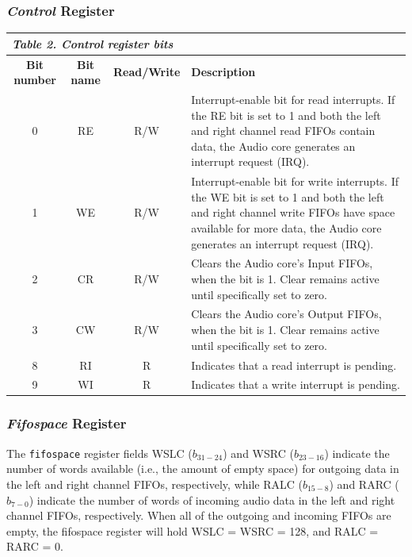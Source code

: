 \documentclass[11pt, twoside, pdftex]{article}
\begin{document}
\newpage
\subsubsection{\textit{Control} Register}
\begin{table}[h]
    \centering
    \begin{tabular}{|c|c|c|p{8.0cm}|}
        \hline
        \multicolumn{4}{|l|}{\it \textbf{Table 2. Control register bits}}
        \\\hline
            \textbf{Bit number}
            & \textbf{Bit name}
            & \textbf{Read/Write}
            & \textbf{Description}
        \\\hline
            0
            & RE
            & R/W
			& Interrupt-enable bit for read interrupts. If the RE bit is set to
			1 and both the left and right channel read FIFOs contain data, the
			Audio core generates an interrupt request (IRQ).
        \\\hline
            1
            & WE
            & R/W
			& Interrupt-enable bit for write interrupts. If the WE bit is set
			to 1 and both the left and right channel write FIFOs have space
			available for more data, the Audio core generates an interrupt 
			request (IRQ).
        \\\hline
            2
            & CR
            & R/W
            & Clears the Audio core's Input FIFOs, when the bit is 1. Clear 
			remains active until specifically set to zero.
        \\\hline
            3
            & CW
            & R/W
            & Clears the Audio core's Output FIFOs, when the bit is 1. Clear 
			remains active until specifically set to zero.
        \\\hline
            8
            & RI
            & R
            & Indicates that a read interrupt is pending.
        \\\hline
            9
            & WI
            & R
            & Indicates that a write interrupt is pending.
        \\\hline
    \end{tabular}
    \label{tab:control_reg}
\end{table}

\subsubsection{\textit{Fifospace} Register}
The \texttt{fifospace} register fields WSLC ($b_{31-24}$) and WSRC
($b_{23-16}$) indicate the number of words available (i.e., the amount of empty 
space) for outgoing data in the left and right channel FIFOs, respectively, 
while RALC ($b_{15-8}$) and RARC
($b_{7-0}$) indicate the number of words of incoming audio data in the left and
right channel FIFOs, respectively. When all of the outgoing and incoming FIFOs
are empty, the fifospace register will hold WSLC = WSRC = 128, and RALC = RARC = 0.
\end{document}
